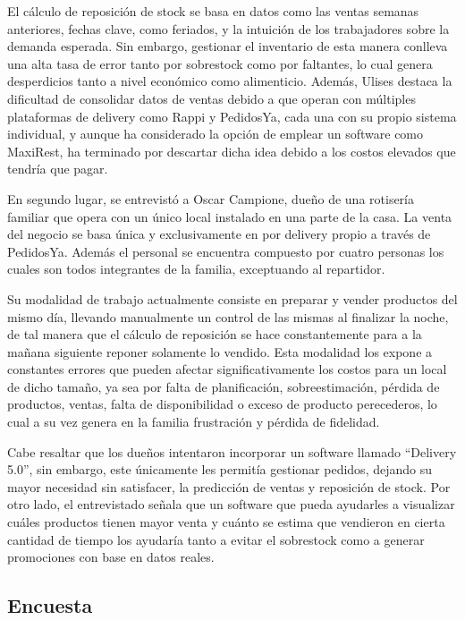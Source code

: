 El cálculo de reposición de stock se basa en datos como las ventas semanas anteriores, fechas clave, como feriados, y la intuición de los trabajadores sobre la demanda esperada. Sin embargo, gestionar el inventario de esta manera conlleva una alta tasa de error tanto por sobrestock como por faltantes, lo cual genera desperdicios tanto a nivel económico como alimenticio. Además, Ulises destaca la dificultad de consolidar datos de ventas debido a que operan con múltiples plataformas de delivery como Rappi y PedidosYa, cada una con su propio sistema individual, y aunque ha considerado la opción de emplear un software como MaxiRest, ha terminado por descartar dicha idea debido a los costos elevados que tendría que pagar.

En segundo lugar, se entrevistó a Oscar Campione, dueño de una rotisería familiar que opera con un único local instalado en una parte de la casa. La venta del negocio se basa única y exclusivamente en por delivery propio a través de PedidosYa. Además el personal se encuentra compuesto por cuatro personas los cuales son todos integrantes de la familia, exceptuando al repartidor.

Su modalidad de trabajo actualmente consiste en preparar y vender productos del mismo día, llevando manualmente un control de las mismas al finalizar la noche, de tal manera que el cálculo de reposición se hace constantemente para a la mañana siguiente reponer solamente lo vendido. Esta modalidad los expone a constantes errores que pueden afectar significativamente los costos para un local de dicho tamaño, ya sea por falta de planificación, sobreestimación, pérdida de productos, ventas, falta de disponibilidad o exceso de producto perecederos, lo cual a su vez genera en la familia frustración y pérdida de fidelidad.

Cabe resaltar que los dueños intentaron incorporar un software llamado “Delivery 5.0”, sin embargo, este únicamente les permitía gestionar pedidos, dejando su mayor necesidad sin satisfacer, la predicción de ventas y reposición de stock. Por otro lado, el entrevistado señala que un software que pueda ayudarles a visualizar cuáles productos tienen mayor venta y cuánto se estima que vendieron en cierta cantidad de tiempo los ayudaría tanto a evitar el sobrestock como a generar promociones con base en datos reales.

\subsection{Encuesta}\label{sec:encuesta}

